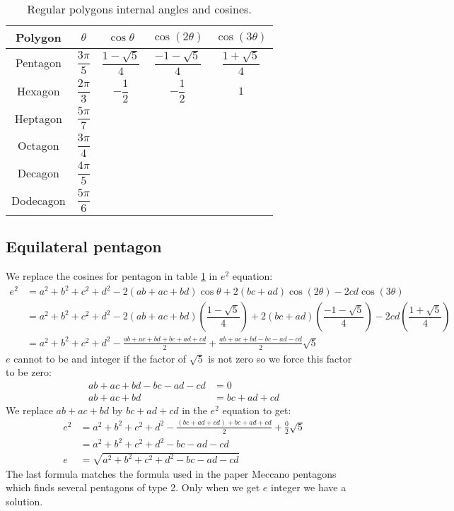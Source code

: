 \documentclass[11pt]{article}
\begin{document}
\begin{table}[h]
\centering
\begin{tabular}{|c c c c c|}\hline
Polygon & $\theta$ & $\cos\theta$ & $\cos(2\theta)$ & $\cos(3\theta)$ \rule[-2ex]{0pt}{6ex}\\ \hline\hline 
Pentagon & $\dfrac{3\pi}{5}$ & $\dfrac{1-\sqrt{5}}{4}$ & $\dfrac{-1-\sqrt{5}}{4}$ & $\dfrac{1+\sqrt{5}}{4}$\rule[-2ex]{0pt}{6ex}\\ \hline
Hexagon & $\dfrac{2\pi}{3}$ & $-\dfrac{1}{2}$ & $-\dfrac{1}{2}$ & $1$ \rule[-2ex]{0pt}{6ex}\\ \hline
Heptagon & $\dfrac{5\pi}{7}$ &  &  & \rule[-2ex]{0pt}{6ex}\\ \hline
Octagon & $\dfrac{3\pi}{4}$ &  &  & \rule[-2ex]{0pt}{6ex}\\ \hline
Decagon & $\dfrac{4\pi}{5}$ &  &  & \rule[-2ex]{0pt}{6ex}\\ \hline
Dodecagon & $\dfrac{5\pi}{6}$ &  &  & \rule[-2ex]{0pt}{6ex}\\ \hline

\end{tabular}
\caption{Regular polygons internal angles and cosines.}
\label{tbl:polygons}
\end{table}

\subsection{Equilateral pentagon}

We replace the cosines for pentagon in table \ref{tbl:polygons} in $e^2$ equation:
\begin{align}
e^2 &= a^2 +b^2 +c^2 +d^2 -2(ab+ac+bd)\cos\theta +2(bc+ad)\cos(2\theta) -2cd\cos(3\theta) \nonumber\\
 &= a^2 +b^2 +c^2 +d^2
  -2(ab+ac+bd)\left(\dfrac{1-\sqrt{5}}{4}\right)
  +2(bc+ad)\left(\dfrac{-1-\sqrt{5}}{4}\right)
  -2cd\left(\dfrac{1+\sqrt{5}}{4}\right) \nonumber\\
 &= a^2 +b^2 +c^2 +d^2 -\frac{ab+ac+bd+bc+ad+cd}{2} +\frac{ab+ac+bd-bc-ad-cd}{2}\sqrt{5}
\end{align}
$e$ cannot to be and integer if the factor of $\sqrt{5}$ is not zero so we force this factor to be zero:
\begin{align}
 ab+ac+bd-bc-ad-cd &= 0\nonumber\\
 ab+ac+bd &= bc+ad+cd
\end{align}
We replace $ab+ac+bd$ by $bc+ad+cd$ in the $e^2$ equation to get:
\begin{align}
e^2 &= a^2 +b^2 +c^2 +d^2 -\frac{(bc+ad+cd)+bc+ad+cd}{2} +\frac{0}{2}\sqrt{5} \nonumber\\
 &= a^2 +b^2 +c^2 +d^2 -bc -ad -cd \nonumber\\
e &= \sqrt{a^2 +b^2 +c^2 +d^2 -bc -ad -cd}
\end{align}
The last formula matches the formula used in the paper Meccano pentagons which finds several pentagons of type 2. 
Only when we get $e$ integer we have a solution.
\end{document}
